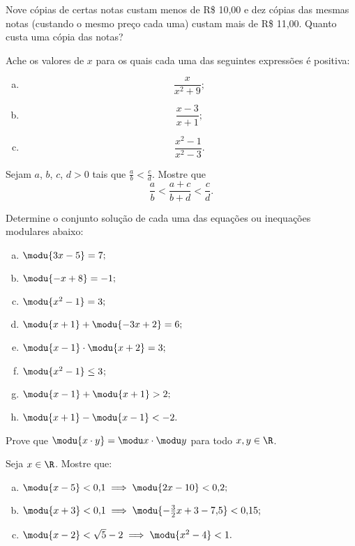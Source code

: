 \begin{exercise}
Nove cópias de certas notas custam menos de R\$ 10,00 e dez
cópias das mesmas notas (custando o mesmo preço cada uma) custam
mais de R\$ 11,00. Quanto custa uma cópia das notas? 
\end{exercise}

\begin{exercise}
Ache os valores de $x$ para os quais cada uma das seguintes
expressões é positiva:
\begin{enumerate}[a.]
  \item $$\frac x {x^2+9};$$
  \item $$\frac{x-3}{x+1};$$
  \item $$\frac{x^2-1}{x^2-3}.$$
\end{enumerate}
\end{exercise}



\begin{exercise}
Sejam  $a$, $b$, $c$, $d > 0$ tais que $\frac a b < \frac c d$.
Mostre que $$\frac a b < \frac {a+c} {b+d} < \frac c d.$$
\end{exercise}

\begin{exercise}
Determine o conjunto solução de cada uma das equações ou
inequações modulares abaixo:
\begin{enumerate}[a.]
  \item $\modu {3x - 5}= 7;$
  \item $\modu {-x +8} = -1;$
  \item $\modu{x^2 - 1}= 3;$
  \item $\modu{x +1} + \modu { -3x +2} = 6;$
  \item $\modu{x-1} \cdot \modu{x+2} = 3;$
  \item $\modu{x^2-1}\le 3$;
  \item $\modu{x-1}+ \modu{x+1}>2;$
  \item $\modu{x+1}- \modu{x-1}<-2.$
\end{enumerate}
\end{exercise}

\begin{exercise}
Prove que $\modu{x\cdot y } = \modu x \cdot \modu y$ para todo
$x, y \in \R$.
\end{exercise}

\begin{exercise}
Seja $x \in \R$. Mostre que:
\begin{enumerate}[a.]
    \item $\modu{x-5}<0{,}1 \implies \modu{2x - 10}< 0{,}2;$
    \item $\modu{x+3}<0{,}1 \implies \modu{-\frac 3 2 x + 3 -
    7{,}5}<0{,}15;$
  \item $\modu{x-2}< \sqrt{5} - 2 \implies \modu{x^2 - 4}< 1.$
\end{enumerate}
\end{exercise}


